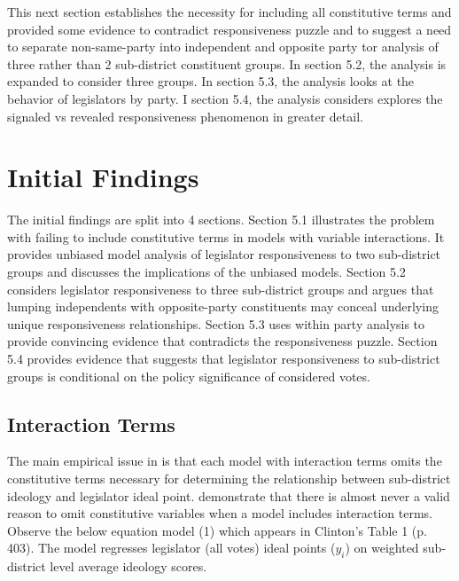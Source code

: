 \documentclass[10pt,letterpaper]{article}
\begin{document}
This next section establishes the necessity for including all constitutive terms and provided some evidence to contradict responsiveness puzzle and to suggest a need to separate non-same-party into independent and opposite party tor analysis of three rather than 2 sub-district constituent groups. In section 5.2, the analysis is expanded to consider three groups. In section 5.3, the analysis looks at the behavior of legislators by party. I section 5.4, the analysis considers explores the signaled vs revealed responsiveness phenomenon in greater detail.

\newpage
 
\newpage

\section{Initial Findings} 
The initial findings are split into 4 sections. Section 5.1 illustrates the problem with failing to include constitutive terms in models with variable interactions. It provides unbiased model analysis of legislator responsiveness to two sub-district groups and discusses the implications of the unbiased models. Section 5.2 considers legislator responsiveness to three sub-district groups and argues that lumping independents with opposite-party constituents may conceal underlying unique responsiveness relationships. Section 5.3 uses within party analysis to provide convincing evidence that contradicts the responsiveness puzzle. Section 5.4 provides evidence that suggests that legislator responsiveness to sub-district groups is conditional on the policy significance of considered votes.

\subsection{Interaction Terms}
The main empirical issue in \cite{Clinton2006} is that each model with interaction terms omits the constitutive terms necessary for determining the relationship between sub-district ideology and legislator ideal point. \cite{Brambor2006} demonstrate that there is almost never a valid reason to omit constitutive variables when a model includes interaction terms. Observe the below equation model (1) which appears in Clinton's Table 1 (p. 403). The model regresses legislator (all votes) ideal points ($y_i$) on weighted sub-district level average ideology scores.
\end{document}

